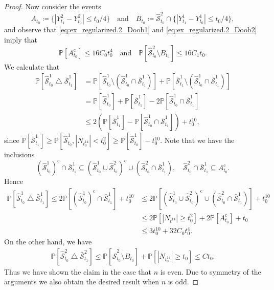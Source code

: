 \documentclass[10pt,a4paper]{amsart}
\def\P{{\mathbb P}}
\newcommand{\Sccc}{\bar{\mathcal S}}
\newcommand{\Scc}{\hat{\mathcal S}}
\begin{document}
\begin{proof}
   Now consider the events
    \begin{equation}
        A_{t_0} \coloneqq \{ |Y_{t_1}^2 - Y_{t_0}^2| \le t_0 / 4 \} \quad
        \mbox{and}\quad
        B_{t_0} \coloneqq \Scc^2_{t_0} \cap \{ |Y_{t_1}^1 - Y_{t_0}^1| \le t_0 / 4 \},
    \end{equation}
    and observe that \eqref{eq:ex_regularized.2_Doob1} and \eqref{eq:ex_regularized.2_Doob2} imply that
    \begin{equation}
        \P[A_{t_0}^\textrm{c}] \le 16C_0 t_0^4 \quad \mbox{and} \quad
        \P[\Scc^2_{t_0} \setminus B_{t_0}] \le 16 C_1 t_0.
    \end{equation}
   We calculate that
   \begin{align}
        \P[\Scc_{t_0}^1 \bigtriangleup \Sccc_{t_1}^1] & = \P[\Scc_{t_0}^1 \setminus (\Scc_{t_0}^1 \cap \Sccc_{t_1}^1)] + \P[\Sccc_{t_1}^1 \setminus (\Scc_{t_0}^1 \cap \Sccc_{t_1}^1)] \\
        & = \P[\Scc^1_{t_0}] + \P[\Sccc^1_{t_1}] - 2\P[\Scc^1_{t_0} \cap \Sccc^1_{t_1}]\\
        & \le 2(\P[\Sccc_{t_1}^1] - \P[\Scc_{t_0}^1 \cap \Sccc_{t_1}^1]) + t_0^{10},
   \end{align}
   since $\P[\Sccc^1_{t_1}] \geq \P[\Scc^1_{t_0}, |N_{t_0^{14}}| < t_0^2] \geq \P[\Scc^1_{t_0}] - t_0^{10}$.
   Note that we have the inclusions
   \begin{equation}
   		(\Scc_{t_0}^1)^\textrm{c} \cap \Sccc_{t_1}^1 \subseteq (\Scc^1_{t_0} \cup \Scc^2_{t_0})^\textrm{c} \cup (\Scc_{t_0}^2 \cap \Sccc_{t_1}^1), \quad \Scc^2_{t_0} \cap \Sccc^1_{t_1} \subseteq A_{t_0}^\textrm{c}.
   \end{equation}
   Hence
   \begin{align}
        \P[\Scc_{t_0}^1 \bigtriangleup \Sccc_{t_1}^1] \le 2\P[(\Scc^1_{t_0})^\textrm{c} \cap \Sccc^1_{t_1}] + t_0^{10}
        & \le 2 \P[(\Scc_{t_0}^1 \cup \Scc_{t_0}^2)^\textrm{c} \cup (\Scc_{t_0}^2 \cap \Sccc_{t_1}^1)] + t_0^{10}
        \\
        & \le 2 \P[|N_{t^{14}}| \ge t_0^2] + 2 \P[A_{t_0}^\textrm{c}] + t_0\\
        & \le 3 t_0^{10} + 32 C_0 t_0^4.
    \end{align}
    On the other hand, we have
    \begin{align}
        \P[\Scc_{t_0}^2 \bigtriangleup \Sccc_{t_1}^2] \le \P[\Scc^2_{t_0} \setminus B_{t_0}] + \P[|N_{t_0^{14}}| \geq t_0]\le C t_0.
    \end{align}
    Thus we have shown the claim in the case that $n$ is even. Due to symmetry of the arguments we also obtain the desired result when $n$ is odd.	
\end{proof}
\end{document}

